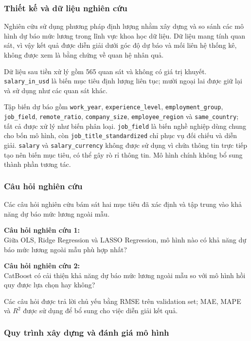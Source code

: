 \subsubsection{Thiết kế và dữ liệu nghiên
cứu}\label{nghi:thiux1ebft-kux1ebf-vuxe0-dux1eef-liux1ec7u-nghiuxean-cux1ee9u}

Nghiên cứu sử dụng phương pháp định lượng nhằm xây dựng và so sánh các
mô hình dự báo mức lương trong lĩnh vực khoa học dữ liệu. Dữ liệu mang
tính quan sát, vì vậy kết quả được diễn giải dưới góc độ dự báo và mối
liên hệ thống kê, không được xem là bằng chứng về quan hệ nhân quả.

Dữ liệu sau tiền xử lý gồm 565 quan sát và không có giá trị khuyết.
\texttt{salary\_in\_usd} là biến mục tiêu định lượng liên tục; mười
ngoại lai được giữ lại và sử dụng như các quan sát khác.

Tập biến dự báo gồm \texttt{work\_year}, \texttt{experience\_level},
\texttt{employment\_group}, \texttt{job\_field}, \texttt{remote\_ratio},
\texttt{company\_size}, \texttt{employee\_region} và
\texttt{same\_country}; tất cả được xử lý như biến phân loại.
\texttt{job\_field} là biến nghề nghiệp dùng chung cho bốn mô hình, còn
\texttt{job\_title\_standardized} chỉ phục vụ đối chiếu và diễn giải.
\texttt{salary} và \texttt{salary\_currency} không được sử dụng vì chứa
thông tin trực tiếp tạo nên biến mục tiêu, có thể gây rò rỉ thông tin.
Mô hình chính không bổ sung thành phần tương tác.

\subsubsection{Câu hỏi nghiên
cứu}\label{nghi:cuxe2u-hux1ecfi-nghiuxean-cux1ee9u}

Các câu hỏi nghiên cứu bám sát hai mục tiêu đã xác định và tập trung vào
khả năng dự báo mức lương ngoài mẫu.

\textbf{Câu hỏi nghiên cứu 1:}\\
Giữa OLS, Ridge Regression và LASSO Regression, mô hình nào có khả năng
dự báo mức lương ngoài mẫu phù hợp nhất?

\textbf{Câu hỏi nghiên cứu 2:}\\
CatBoost có cải thiện khả năng dự báo mức lương ngoài mẫu so với mô hình
hồi quy được lựa chọn hay không?

Các câu hỏi được trả lời chủ yếu bằng RMSE trên validation set; MAE,
MAPE và \(R^2\) được sử dụng để bổ sung cho việc diễn giải kết quả.

\subsubsection{Quy trình xây dựng và đánh giá mô
hình}\label{nghi:quy-truxecnh-xuxe2y-dux1ef1ng-vuxe0-ux111uxe1nh-giuxe1-muxf4-huxecnh}

